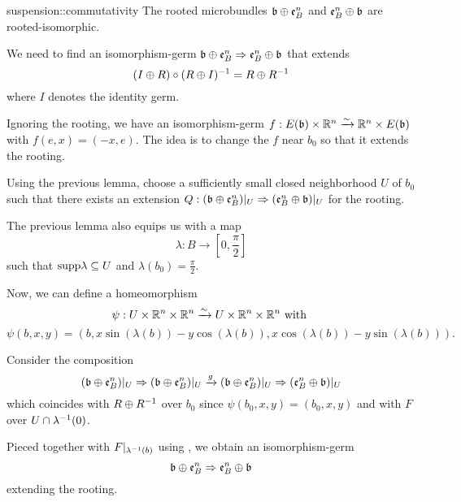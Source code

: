 \begin{mylemma}{suspension::commutativity}
    The rooted microbundles $\mathfrak{b} \oplus{} \mathfrak{e}^{n}_{B}$ and $\mathfrak{e}^{n}_{B} \oplus{} \mathfrak{b}$ are rooted-isomorphic. 
\end{mylemma}

\begin{myproof}
    We need to find an isomorphism-germ
    $\mathfrak{b} \oplus{} \mathfrak{e}^{n}_{B} \Rightarrow{} \mathfrak{e}^{n}_{B} \oplus{} \mathfrak{b}$ that extends
    \[ (I \oplus{} R) \circ (R \oplus{} I)^{-1} = R \oplus{} R^{-1} \]
    where $I$ denotes the identity germ.

    Ignoring the rooting, we have an
    isomorphism-germ $f: E(\mathfrak{b}) \times \mathbb{R}^n \xrightarrow{\sim} \mathbb{R}^n \times E(\mathfrak{b})$ with $f(e, x) = (-x, e)$.
    The idea is to change the $f$ near $b_0$ so that it extends the rooting.

    Using the previous lemma, choose a sufficiently small closed neighborhood $U$ of $b_0$
    such that there exists an extension
    $Q: (\mathfrak{b} \oplus{} \mathfrak{e}^{n}_{B})\vert_{U} \Rightarrow{} (\mathfrak{e}^{n}_{B} \oplus{} \mathfrak{b})\vert_{U}$ for the rooting.

    The previous lemma also equips us with a map
    \[ \lambda: B \to [0, \frac{\pi}{2}] \]
    such that $\text{supp} \lambda \subseteq{} U$ and $\lambda(b_0) = \frac{\pi}{2}$.
    
    Now, we can define a homeomorphism
    \[ \psi: U \times \mathbb{R}^n \times \mathbb{R}^n \xrightarrow{\sim} U \times \mathbb{R}^n \times \mathbb{R}^n \text{ with } \]
    \[ \psi(b, x, y) = (b, x \sin(\lambda(b)) - y \cos(\lambda(b)), x \cos(\lambda(b)) - y \sin(\lambda(b))). \]

    Consider the composition
    \[ (\mathfrak{b} \oplus{} \mathfrak{e}^{n}_{B})\vert_{U} \Rightarrow{} (\mathfrak{b} \oplus{} \mathfrak{e}^{n}_{B})\vert_{U} \xrightarrow{g} (\mathfrak{b} \oplus{} \mathfrak{e}^{n}_{B})\vert_{U} \Rightarrow{} (\mathfrak{e}^{n}_{B} \oplus{} \mathfrak{b})\vert_{U} \]
    which coincides with $R \oplus{} R^{-1}$ over $b_0$
    since $\psi(b_0, x, y) = (b_0, x, y)$ and with $F$ over $U \cap \lambda^{-1}(0)$.
    
    Pieced together with $F\vert_{\lambda^{-1}(b)}$ using ,
    we obtain an isomorphism-germ 
    \[ \mathfrak{b} \oplus{} \mathfrak{e}^{n}_{B} \Rightarrow{} \mathfrak{e}^{n}_{B} \oplus{} \mathfrak{b} \]
    extending the rooting.
\end{myproof}